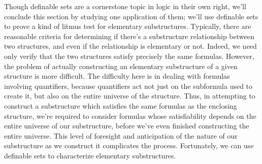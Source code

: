 \documentclass{article}
\begin{document}
Though definable sets are a cornerstone topic in logic in their own right, we'll conclude this section by studying one application of them; we'll use definable sets to prove a kind of litmus test for elementary substructures. Typically, there are reasonable criteria for determining if there's a substructure relationship between two structures, and even if the relationship is elementary or not. Indeed, we need only verify that the two structures satisfy precisely the same formulas. However, the problem of actually constructing an elementary substructure of a given structure is more difficult. The difficulty here is in dealing with formulas involving quantifiers, because quantifiers act not just on the subformula used to create it, but also on the entire universe of the structure. Thus, in attempting to construct a substructure which satisfies the same formulas as the enclosing structure, we're required to consider formulas whose satisfiability depends on the entire universe of our substructure, before we've even finished constructing the entire universe. This level of foresight and anticipation of the nature of our substructure as we construct it complicates the process. Fortunately, we can use definable sets to characterize elementary substructures.
\end{document}
